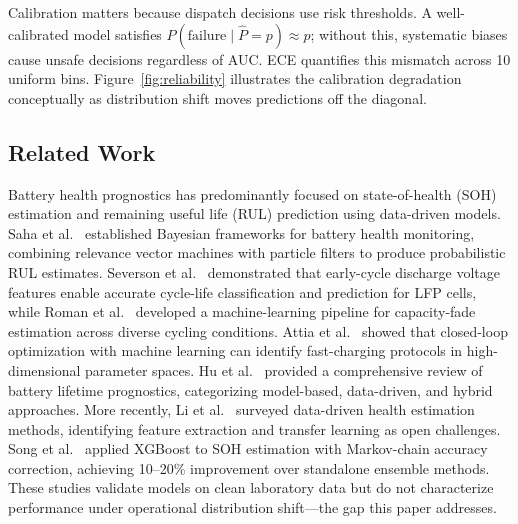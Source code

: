 \documentclass[11pt,a4paper]{article}
\begin{document}
Calibration matters because dispatch decisions use risk thresholds. A well-calibrated model satisfies \(P(\text{failure} \mid \hat{P}=p) \approx p\); without this, systematic biases cause unsafe decisions regardless of AUC. ECE quantifies this mismatch across 10 uniform bins. Figure~\ref{fig:reliability} illustrates the calibration degradation conceptually as distribution shift moves predictions off the diagonal.

\subsection{Related Work}

Battery health prognostics has predominantly focused on state-of-health (SOH) estimation and remaining useful life (RUL) prediction using data-driven models. Saha et al.~\cite{saha2009prognostics} established Bayesian frameworks for battery health monitoring, combining relevance vector machines with particle filters to produce probabilistic RUL estimates. Severson et al.~\cite{severson2019data} demonstrated that early-cycle discharge voltage features enable accurate cycle-life classification and prediction for LFP cells, while Roman et al.~\cite{roman2021machine} developed a machine-learning pipeline for capacity-fade estimation across diverse cycling conditions. Attia et al.~\cite{attia2020closed} showed that closed-loop optimization with machine learning can identify fast-charging protocols in high-dimensional parameter spaces. Hu et al.~\cite{hu2020battery} provided a comprehensive review of battery lifetime prognostics, categorizing model-based, data-driven, and hybrid approaches. More recently, Li et al.~\cite{li2019data} surveyed data-driven health estimation methods, identifying feature extraction and transfer learning as open challenges. Song et al.~\cite{song2020lithium} applied XGBoost to SOH estimation with Markov-chain accuracy correction, achieving 10--20\% improvement over standalone ensemble methods. These studies validate models on clean laboratory data but do not characterize performance under operational distribution shift---the gap this paper addresses.
\end{document}
